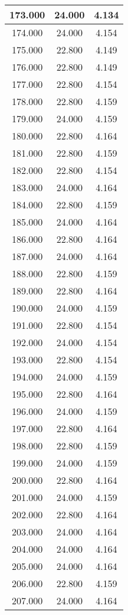 \begin{longtable}[c]{|c|c|c|}
173.000	&24.000&4.134  \\ \hline 	
174.000	&24.000&4.154  \\ \hline 	
175.000	&22.800&4.149  \\ \hline 	
176.000	&22.800&4.149  \\ \hline 	
177.000	&22.800&4.154  \\ \hline 	
178.000	&22.800&4.159  \\ \hline 	
179.000	&24.000&4.159  \\ \hline 	
180.000	&22.800&4.164  \\ \hline 	
181.000	&22.800&4.159  \\ \hline 	
182.000	&22.800&4.154  \\ \hline 	
183.000	&24.000&4.164  \\ \hline 	
184.000	&22.800&4.159  \\ \hline 	
185.000	&24.000&4.164  \\ \hline 	
186.000	&22.800&4.164  \\ \hline 	
187.000	&24.000&4.164  \\ \hline 	
188.000	&22.800&4.159  \\ \hline 	
189.000	&22.800&4.164  \\ \hline 	
190.000	&24.000&4.159  \\ \hline 	
191.000	&22.800&4.154  \\ \hline 	
192.000	&24.000&4.154  \\ \hline 	
193.000	&22.800&4.154  \\ \hline 	
194.000	&24.000&4.159  \\ \hline 	
195.000	&22.800&4.164  \\ \hline 	
196.000	&24.000&4.159  \\ \hline 	
197.000	&22.800&4.164  \\ \hline 	
198.000	&22.800&4.159  \\ \hline 	
199.000	&24.000&4.159  \\ \hline 	
200.000	&22.800&4.164  \\ \hline 	
201.000	&24.000&4.159  \\ \hline 	
202.000	&22.800&4.164  \\ \hline 	
203.000	&24.000&4.164  \\ \hline 	
204.000	&24.000&4.164  \\ \hline 	
205.000	&24.000&4.164  \\ \hline 	
206.000	&22.800&4.159  \\ \hline 	
207.000	&24.000&4.164  \\ \hline 	

\end{longtable}
